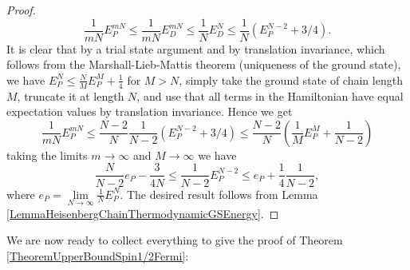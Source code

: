 \begin{proof}
\begin{equation}
\frac{1}{mN}E_P^{mN}\leq \frac{1}{mN}E_D^{mN}\leq \frac{1}{N}E_D^N\leq \frac{1}{N}\left(E_P^{N-2}+3/4\right).
\end{equation}
It is clear that by a trial state argument and by translation invariance, which follows from the Marshall-Lieb-Mattis theorem (uniqueness of the ground state), we have $ E_P^N\leq \frac{N}{M}E_P^M+\frac{1}{4} $ for $ M>N $, simply take the ground state of chain length $ M $, truncate it at length $ N $, and use that all terms in the Hamiltonian have equal expectation values by translation invariance. Hence we get \begin{equation}
\frac{1}{mN}E_P^{mN}\leq\frac{N-2}{N}\frac{1}{N-2}\left(E_P^{N-2}+3/4\right)\leq \frac{N-2}{N} \left(\frac{1}{M}E^{M}_P +\frac{1}{N-2}\right)
\end{equation}
taking the limits $ m\to \infty $ and $ M\to\infty $ we have \begin{equation}
\frac{N}{N-2}e_P-\frac{3}{4N}\leq\frac{1}{N-2}E_P^{N-2}\leq e_P+\frac{1}{4}\frac{1}{N-2},
\end{equation}
where $ e_P=\lim\limits_{N\to\infty}\frac{1}{N}E_P^N $. The desired result follows from Lemma \ref{LemmaHeisenbergChainThermodynamicGSEnergy}.
\end{proof}
We are now ready to collect everything to give the proof of Theorem \ref{TheoremUpperBoundSpin1/2Fermi}:
